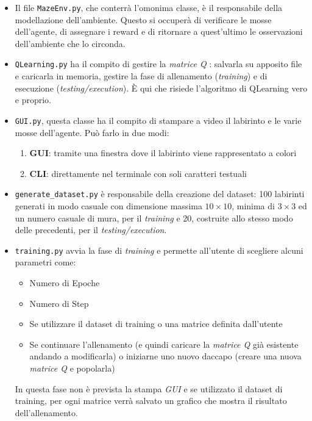 \begin{itemize}
	\item Il file \lstinline[style=cmd]|MazeEnv.py|, che conterr\`{a} l'omonima classe, \`{e} il responsabile della modellazione dell'ambiente. Questo si occuper\`{a}  di verificare le mosse dell'agente, di assegnare i reward e di ritornare a quest'ultimo le osservazioni dell'ambiente che lo circonda.
	\item \lstinline[style=cmd]|QLearning.py| ha il compito di gestire la \textit{matrice Q }: salvarla su apposito file e caricarla in memoria, gestire la fase di allenamento (\textit{training}) e di esecuzione (\textit{testing/execution}). \`{E} qui che risiede l'algoritmo di QLearning vero e proprio.
	\item \lstinline[style=cmd]|GUI.py|, questa classe ha il compito di stampare a video il labirinto e le varie mosse dell'agente. Pu\`{o} farlo in due modi: 
	\begin{enumerate}
		\item \textbf{GUI}: tramite una finestra dove il labirinto viene rappresentato a colori
		\item  \textbf{CLI}: direttamente nel terminale con soli caratteri testuali
	\end{enumerate}
	\item \lstinline[style=cmd]|generate_dataset.py| \`{e} responsabile della creazione del dataset: 100 labirinti generati in modo casuale con dimensione massima $10 \times 10$, minima di $3 \times 3$ ed un numero casuale di mura, per il \textit{training} e 20, costruite allo stesso modo delle precedenti, per il \textit{testing/execution}.
	\item \lstinline[style=cmd]|training.py| avvia la fase di \textit{training} e permette all'utente di scegliere alcuni parametri come:
	\begin{itemize}
		\item Numero di Epoche
		\item Numero di Step
		\item Se utilizzare il dataset di training o una matrice definita dall'utente
		\item Se continuare l'allenamento (e quindi caricare la \textit{matrice Q} gi\`{a} esistente andando a modificarla) o iniziarne uno nuovo daccapo (creare una nuova \textit{matrice Q} e popolarla)
	\end{itemize}
	In questa fase non \`{e} prevista la stampa \textit{GUI} e se utilizzato il dataset di training, per ogni matrice verr\`{a} salvato un grafico che mostra il risultato dell'allenamento.

\end{itemize}
